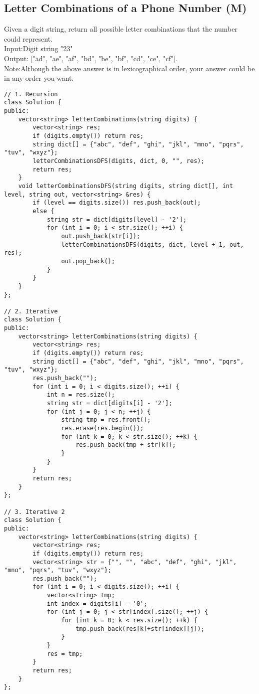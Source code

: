 \subsection{Letter Combinations of a Phone Number (M)}
Given a digit string, return all possible letter combinations that the number could represent.\\

Input:Digit string "23"\\
Output: ["ad", "ae", "af", "bd", "be", "bf", "cd", "ce", "cf"].\\

Note:Although the above answer is in lexicographical order, your answer could be in any order you want. \\

\begin{lstlisting}
// 1. Recursion
class Solution {
public:
    vector<string> letterCombinations(string digits) {
        vector<string> res;
        if (digits.empty()) return res;
        string dict[] = {"abc", "def", "ghi", "jkl", "mno", "pqrs", "tuv", "wxyz"};
        letterCombinationsDFS(digits, dict, 0, "", res);
        return res;
    }
    void letterCombinationsDFS(string digits, string dict[], int level, string out, vector<string> &res) {
        if (level == digits.size()) res.push_back(out);
        else {
            string str = dict[digits[level] - '2'];
            for (int i = 0; i < str.size(); ++i) {
                out.push_back(str[i]);
                letterCombinationsDFS(digits, dict, level + 1, out, res);
                out.pop_back();
            }
        }
    }
};

// 2. Iterative
class Solution {
public:
    vector<string> letterCombinations(string digits) {
        vector<string> res;
        if (digits.empty()) return res;
        string dict[] = {"abc", "def", "ghi", "jkl", "mno", "pqrs", "tuv", "wxyz"};
        res.push_back("");
        for (int i = 0; i < digits.size(); ++i) {
            int n = res.size();
            string str = dict[digits[i] - '2'];
            for (int j = 0; j < n; ++j) {
                string tmp = res.front();
                res.erase(res.begin());
                for (int k = 0; k < str.size(); ++k) {
                    res.push_back(tmp + str[k]);
                }
            }
        }
        return res;
    }
};

// 3. Iterative 2
class Solution {
public:
    vector<string> letterCombinations(string digits) {
        vector<string> res;
        if (digits.empty()) return res;
        vector<string> str = {"", "", "abc", "def", "ghi", "jkl", "mno", "pqrs", "tuv", "wxyz"};
        res.push_back("");
        for (int i = 0; i < digits.size(); ++i) {
            vector<string> tmp;
            int index = digits[i] - '0';
            for (int j = 0; j < str[index].size(); ++j) {
                for (int k = 0; k < res.size(); ++k) {
                    tmp.push_back(res[k]+str[index][j]);
                }
            }
            res = tmp;
        }
        return res;
    }
};
\end{lstlisting}


